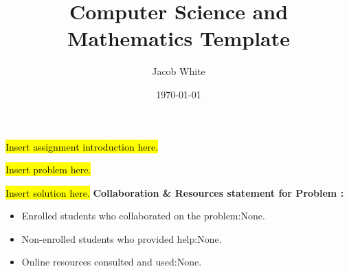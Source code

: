 \documentclass{article}
\title{Computer Science and Mathematics Template}
\author{Jacob White}
\date{\today}
\begin{document}
\maketitle

\noindent \hl{Insert assignment introduction here.}

\begin{problem} 
    \hl{Insert problem here.}
\end{problem}
\begin{solution}
    \hl{Insert solution here.}
    \vfill
    \noindent \textbf{Collaboration \& Resources statement for Problem \theproblem:}
    \begin{itemize}
        \item Enrolled students who collaborated on the problem:\space None.
        \item Non-enrolled students who provided help:\space None.
        \item Online resources consulted and used:\space None.
    \end{itemize}
\end{solution}
\end{document}
